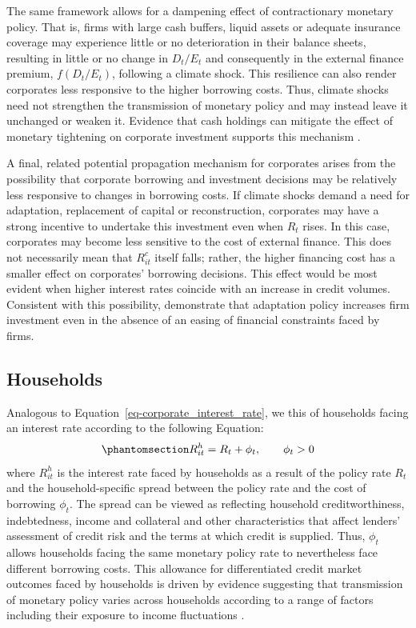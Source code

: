 \documentclass[
  letterpaper,
  DIV=11,
  numbers=noendperiod]{scrartcl}
\begin{document}
The same framework allows for a dampening effect of contractionary
monetary policy. That is, firms with large cash buffers, liquid assets
or adequate insurance coverage may experience little or no deterioration
in their balance sheets, resulting in little or no change in \(D_t/E_t\)
and consequently in the external finance premium, \(f(D_t/E_t)\),
following a climate shock. This resilience can also render corporates
less responsive to the higher borrowing costs. Thus, climate shocks need
not strengthen the transmission of monetary policy and may instead leave
it unchanged or weaken it. Evidence that cash holdings can mitigate the
effect of monetary tightening on corporate investment supports this
mechanism \citep{SharpeSuarez2020}.

A final, related potential propagation mechanism for corporates arises
from the possibility that corporate borrowing and investment decisions
may be relatively less responsive to changes in borrowing costs. If
climate shocks demand a need for adaptation, replacement of capital or
reconstruction, corporates may have a strong incentive to undertake this
investment even when \(R_t\) rises. In this case, corporates may become
less sensitive to the cost of external finance. This does not
necessarily mean that \(R_{it}^{c}\) itself falls; rather, the higher
financing cost has a smaller effect on corporates' borrowing decisions.
This effect would be most evident when higher interest rates coincide
with an increase in credit volumes. Consistent with this possibility,
\citet{XU2025108087} demonstrate that adaptation policy increases firm
investment even in the absence of an easing of financial constraints
faced by firms.

\subsection{Households}\label{households}

Analogous to Equation~\ref{eq-corporate_interest_rate}, we this of
households facing an interest rate according to the following Equation:
\begin{equation}\phantomsection\label{eq-household_interest_rate}{
R_{it}^{h} = R_t + \phi_{t}, \qquad \phi_{t} > 0
}\end{equation} where \(R_{it}^{h}\) is the interest rate faced by
households as a result of the policy rate \(R_t\) and the
household-specific spread between the policy rate and the cost of
borrowing \(\phi_{t}\). The spread can be viewed as reflecting household
creditworthiness, indebtedness, income and collateral and other
characteristics that affect lenders' assessment of credit risk and the
terms at which credit is supplied. Thus, \(\phi_{t}\) allows households
facing the same monetary policy rate to nevertheless face different
borrowing costs. This allowance for differentiated credit market
outcomes faced by households is driven by evidence suggesting that
transmission of monetary policy varies across households according to a
range of factors including their exposure to income fluctuations
\citep{SLACALEK2020103879}.
\end{document}
